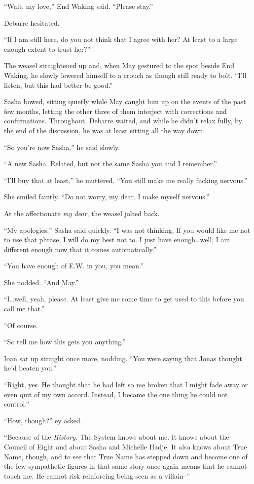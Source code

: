 ``Wait, my love,'' End Waking said. ``Please stay.''

Debarre hesitated.

``If I am still here, do you not think that I agree with her? At least to a large enough extent to trust her?''

The weasel straightened up and, when May gestured to the spot beside End Waking, he slowly lowered himself to a crouch as though still ready to bolt. ``I'll listen, but this had better be good.''

Sasha bowed, sitting quietly while May caught him up on the events of the past few months, letting the other three of them interject with corrections and confirmations. Throughout, Debarre waited, and while he didn't relax fully, by the end of the discussion, he was at least sitting all the way down.

``So you're now Sasha,'' he said slowly.

``A new Sasha. Related, but not the same Sasha you and I remember.''

``I'll buy that at least,'' he muttered. ``You still make me really fucking nervous.''

She smiled faintly. ``Do not worry, my dear. I make myself nervous.''

At the affectionate \emph{my dear}, the weasel jolted back.

``My apologies,'' Sasha said quickly. ``I was not thinking. If you would like me not to use that phrase, I will do my best not to. I just have enough\ldots well, I am different enough now that it comes automatically.''

``You have enough of E.W. in you, you mean.''

She nodded. ``And May.''

``I\ldots well, yeah, please. At least give me some time to get used to this before you call me that.''

``Of course.

``So tell me how this gets you anything.''

Ioan sat up straight once more, nodding. ``You were saying that Jonas thought he'd beaten you.''

``Right, yes. He thought that he had left so me broken that I might fade away or even quit of my own accord. Instead, I became the one thing he could not control.''

``How, though?'' ey asked.

``Because of the \emph{History}. The System knows about me. It knows about the Council of Eight and about Sasha and Michelle Hadje. It also knows about True Name, though, and to see that True Name has stepped down and become one of the few sympathetic figures in that same story once again means that he cannot touch me. He cannot risk reinforcing being seen as a villain--''

